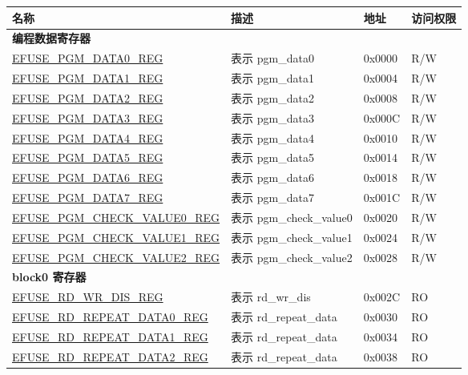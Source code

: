 \begin{longtable}{ | p{7cm} | p{6cm} | p{1.2cm} | p{1.5cm} | }
\hline\rowcolor{lightgray}
名称 & 描述 &  地址 & 访问权限 \\ \hline
\endhead
\multicolumn{4}{|l|}{\textbf{编程数据寄存器}} \\ \hline
\hyperref[regdesc:EFUSEPGMDATANREG]{EFUSE\_PGM\_DATA0\_REG} & 表示 pgm\_data0 & 0x0000 & R/W \\ \hline
\hyperref[regdesc:EFUSEPGMDATANREG]{EFUSE\_PGM\_DATA1\_REG} & 表示 pgm\_data1 & 0x0004 & R/W \\ \hline
\hyperref[regdesc:EFUSEPGMDATANREG]{EFUSE\_PGM\_DATA2\_REG} & 表示 pgm\_data2 & 0x0008 & R/W \\ \hline
\hyperref[regdesc:EFUSEPGMDATANREG]{EFUSE\_PGM\_DATA3\_REG} & 表示 pgm\_data3 & 0x000C & R/W \\ \hline
\hyperref[regdesc:EFUSEPGMDATANREG]{EFUSE\_PGM\_DATA4\_REG} & 表示 pgm\_data4 & 0x0010 & R/W \\ \hline
\hyperref[regdesc:EFUSEPGMDATANREG]{EFUSE\_PGM\_DATA5\_REG} & 表示 pgm\_data5 & 0x0014 & R/W \\ \hline
\hyperref[regdesc:EFUSEPGMDATANREG]{EFUSE\_PGM\_DATA6\_REG} & 表示 pgm\_data6 & 0x0018 & R/W \\ \hline
\hyperref[regdesc:EFUSEPGMDATANREG]{EFUSE\_PGM\_DATA7\_REG} & 表示 pgm\_data7 & 0x001C & R/W \\ \hline
\hyperref[regdesc:EFUSEPGMCHECKVALUENREG]{EFUSE\_PGM\_CHECK\_VALUE0\_REG} & 表示 pgm\_check\_value0 & 0x0020 & R/W \\ \hline
\hyperref[regdesc:EFUSEPGMCHECKVALUENREG]{EFUSE\_PGM\_CHECK\_VALUE1\_REG} & 表示 pgm\_check\_value1 & 0x0024 & R/W \\ \hline
\hyperref[regdesc:EFUSEPGMCHECKVALUENREG]{EFUSE\_PGM\_CHECK\_VALUE2\_REG} & 表示 pgm\_check\_value2 & 0x0028 & R/W \\ \hline
\multicolumn{4}{|l|}{\textbf{block0 寄存器}} \\ \hline
\hyperref[regdesc:EFUSERDWRDISREG]{EFUSE\_RD\_WR\_DIS\_REG} & 表示 rd\_wr\_dis & 0x002C & RO \\ \hline
\hyperref[regdesc:EFUSERDREPEATDATA0REG]{EFUSE\_RD\_REPEAT\_DATA0\_REG} & 表示 rd\_repeat\_data & 0x0030 & RO \\ \hline
\hyperref[regdesc:EFUSERDREPEATDATA1REG]{EFUSE\_RD\_REPEAT\_DATA1\_REG} & 表示 rd\_repeat\_data & 0x0034 & RO \\ \hline
\hyperref[regdesc:EFUSERDREPEATDATA2REG]{EFUSE\_RD\_REPEAT\_DATA2\_REG} & 表示 rd\_repeat\_data & 0x0038 & RO \\ \hline

\end{longtable}
